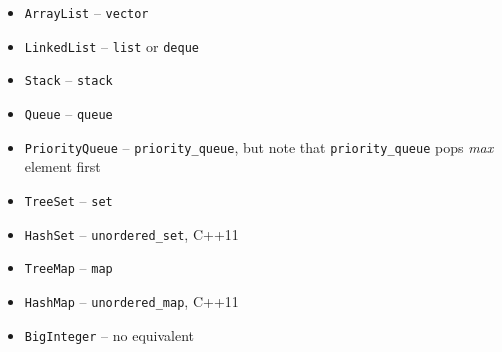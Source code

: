 \begin{itemize}

\item \texttt{ArrayList} -- \texttt{vector}
\item \texttt{LinkedList} -- \texttt{list} or \texttt{deque}
\item \texttt{Stack} -- \texttt{stack}
\item \texttt{Queue} -- \texttt{queue}
\item \texttt{PriorityQueue} -- \texttt{priority\_queue}, but note that \texttt{priority\_queue} pops \textit{max} element first
\item \texttt{TreeSet} -- \texttt{set}
\item \texttt{HashSet} -- \texttt{unordered\_set}, C++11
\item \texttt{TreeMap} -- \texttt{map}
\item \texttt{HashMap} -- \texttt{unordered\_map}, C++11
\item \texttt{BigInteger} -- no equivalent

\end{itemize}
